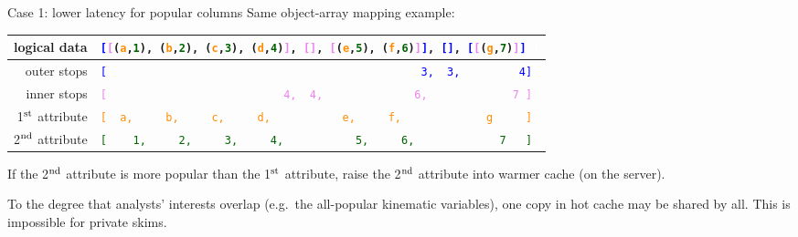 \documentclass[aspectratio=169]{beamer}
\begin{document}
\begin{frame}{Case 1: lower latency for popular columns}
\vspace{0.5 cm}
Same object-array mapping example:

\vspace{0.25 cm}
\begin{tabular}{r l}
\small logical data & {\tt\scriptsize \textcolor{blue}{[}\textcolor{violet}{[}(\textcolor{darkorange}{a},\textcolor{darkgreen}{1}), (\textcolor{darkorange}{b},\textcolor{darkgreen}{2}), (\textcolor{darkorange}{c},\textcolor{darkgreen}{3}), (\textcolor{darkorange}{d},\textcolor{darkgreen}{4})\textcolor{violet}{]}, \textcolor{violet}{[]}, \textcolor{violet}{[}(\textcolor{darkorange}{e},\textcolor{darkgreen}{5}), (\textcolor{darkorange}{f},\textcolor{darkgreen}{6})\textcolor{violet}{]}\textcolor{blue}{]}, \textcolor{blue}{[]}, \textcolor{blue}{[}\textcolor{violet}{[}(\textcolor{darkorange}{g},\textcolor{darkgreen}{7})\textcolor{violet}{]}\textcolor{blue}{]}\ \textcolor{white}{]}} \\\hline
\small outer stops & {\tt\scriptsize \textcolor{blue}{[\ \ \ \ \ \ \ \ \ \ \ \ \ \ \ \ \ \ \ \ \ \ \ \ \ \ \ \ \ \ \ \ \ \ \ \ \ \ \ \ \ \ \ \ \ \ \ \ 3,\ \ 3,\ \ \ \ \ \ \ \ \ 4]}} \\
\small inner stops & {\tt\scriptsize \textcolor{violet}{[\ \ \ \ \ \ \ \ \ \ \ \ \ \ \ \ \ \ \ \ \ \ \ \ \ \ \ 4,\ \ 4,\ \ \ \ \ \ \ \ \ \ \ \ \ \ 6,\ \ \ \ \ \ \ \ \ \ \ \ \ 7\ ]}} \\
\small 1$^{\mbox{\scriptsize st}}$ attribute & {\tt\scriptsize \textcolor{darkorange}{[\ \ a,\ \ \ \ \ b,\ \ \ \ \ c,\ \ \ \ \ d,\ \ \ \ \ \ \ \ \ \ \ e,\ \ \ \ \ f,\ \ \ \ \ \ \ \ \ \ \ \ \ g\ \ \ \ \ ]}} \\
\small 2$^{\mbox{\scriptsize nd}}$ attribute & {\tt\scriptsize \textcolor{darkgreen}{[\ \ \ \ 1,\ \ \ \ \ 2,\ \ \ \ \ 3,\ \ \ \ \ 4,\ \ \ \ \ \ \ \ \ \ \ 5,\ \ \ \ \ 6,\ \ \ \ \ \ \ \ \ \ \ \ \ 7\ \ \ ]}}
\end{tabular}

\vspace{0.5 cm}
If the 2$^{\mbox{\scriptsize nd}}$ attribute is more popular than the 1$^{\mbox{\scriptsize st}}$ attribute, raise the 2$^{\mbox{\scriptsize nd}}$ attribute into warmer cache (on the server).

\vspace{0.5 cm}
To the degree that analysts' interests overlap (e.g.\ the all-popular kinematic variables), one copy in hot cache may be shared by all. This is impossible for private skims.
\end{frame}
\end{document}
